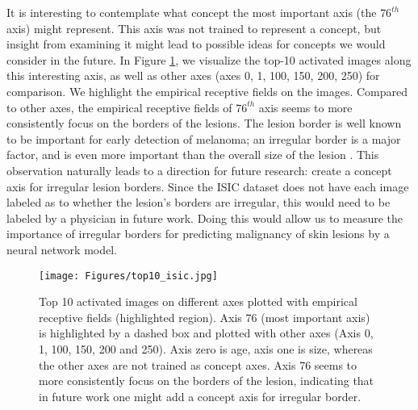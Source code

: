\documentclass{article}
\begin{document}
It is interesting to contemplate what concept the most important axis (the $76^{th}$ axis) might represent. This axis was not trained to represent a concept, but insight from examining it might lead to possible ideas for concepts we would consider in the future. In Figure \ref{fig:top10_lesion_region}, we visualize the top-10 activated images along this interesting axis, as well as other axes (axes 0, 1, 100, 150, 200, 250) for comparison. We highlight the empirical receptive fields \cite{zhou2014object} on the images. Compared to other axes, the empirical receptive fields of $76^{th}$ axis seems to more consistently focus on the borders of the lesions. The lesion border is well known to be important for early detection of melanoma; an irregular border is a major factor, and is even more important than the overall size of the lesion \cite{walter2013using}. 
This observation naturally leads to a direction for future research: create a concept axis for irregular lesion borders. Since the ISIC dataset does not have each image labeled as to whether the lesion's borders are irregular, this would need to be labeled by a physician in future work. Doing this would allow us to measure the importance of irregular borders for predicting malignancy of skin lesions by a neural network model.

\begin{figure}[t]
    \centering
    \texttt{[image: Figures/top10\_isic.jpg]}
    \caption{Top 10 activated images on different axes plotted with empirical receptive fields (highlighted region). Axis 76 (most important axis) is highlighted by a dashed box and plotted with other axes (Axis 0, 1, 100, 150, 200 and 250). Axis zero is age, axis one is size, whereas the other axes are not trained as concept axes. Axis 76 seems to more consistently focus on the borders of the lesion, indicating that in future work one might add a concept axis for irregular border.}
    \label{fig:top10_lesion_region}
\end{figure}
\end{document}
